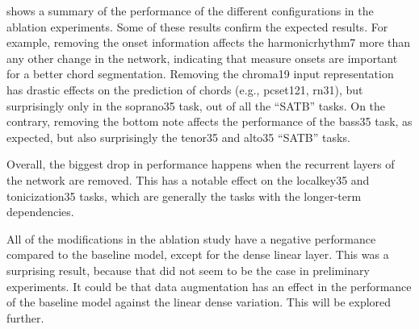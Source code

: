 

 shows a summary of the performance of the
different configurations in the ablation experiments. Some
of these results confirm the expected results. For example,
removing the onset information affects the
\gls{harmonicrhythm7} more than any other change in the
network, indicating that measure onsets are important for a
better chord segmentation. Removing the \gls{chroma19} input
representation has drastic effects on the prediction of
chords (e.g., \gls{pcset121}, \gls{rn31}), but surprisingly
only in the \gls{soprano35} task, out of all the ``SATB''
tasks. On the contrary, removing the bottom note affects the
performance of the \gls{bass35} task, as expected, but also
surprisingly the \gls{tenor35} and \gls{alto35} ``SATB''
tasks.

Overall, the biggest drop in performance happens when the
recurrent layers of the network are removed. This has a
notable effect on the \gls{localkey35} and
\gls{tonicization35} tasks, which are generally the tasks
with the longer-term dependencies. 

All of the modifications in the ablation study have a
negative performance compared to the baseline model, except
for the dense linear layer. This was a surprising result,
because that did not seem to be the case in preliminary
experiments. It could be that data augmentation has an
effect in the performance of the baseline model against the
linear dense variation. This will be explored further.
